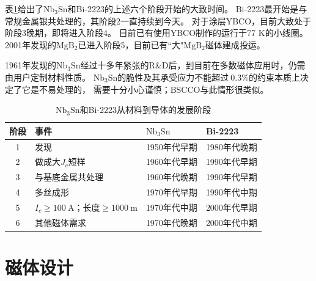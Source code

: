 表\ref{scstage}给出了$\mathrm{Nb_3Sn}$和Bi-2223的上述六个阶段开始的大致时间。
Bi-2223最开始是与常规金属银共处理的，其阶段2一直持续到今天。
对于涂层YBCO，目前大致处于阶段3晚期，即将进入阶段4。
目前已有使用YBCO制作的运行于77 K的小线圈。
2001年发现的$\mathrm{MgB_2}$已进入阶段5，目前已有``大"$\mathrm{MgB_2}$磁体建成投运。

1961年发现的$\mathrm{Nb_3Sn}$经过十多年紧张的R\&D后，到目前在多数磁体应用时，仍需由用户定制材料性质。
$\mathrm{Nb_3Sn}$的脆性及其承受应力不能超过$~0.3\%$的约束本质上决定了它是不易处理的，
需要十分小心谨慎；BSCCO与此情形很类似。

\begin{table}[htbp]\small
  \centering
  \caption{$\mathrm{Nb_3Sn}$和Bi-2223从材料到导体的发展阶段} \label{scstage}
\begin{tabular}{|c|l|l|l|}
  \hline
  阶段&事件& $\mathrm{Nb_3Sn}$ &Bi-2223 \\ \hline
1 & 发现 & 1950年代早期& 1980年代晚期 \\ \hline
2 & 做成大$J_c$短样 & 1960年代早期 & 1990年代早期\\ \hline
3 &与基底金属共处理&1960年代晚期&1990年代早期\\ \hline
4 &多丝成形&1970年代早期&1990年代中期\\ \hline
5 &$I_c\ge 100\ \mathrm{A}$；长度$\ge 1000\ \mathrm{m}$ &1970年代中期&2000年代早期\\ \hline
6 &其他磁体需求&1970年代晚期&2000年代中期\\
  \hline
\end{tabular}
\end{table}


\section{磁体设计}
